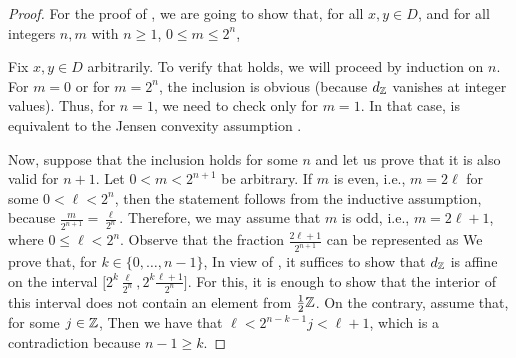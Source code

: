 \begin{proof} For the proof of , we are going to show that, for all $x,y\in D$,
and for all integers $n,m$ with $n\geq 1$, $0\leq m\leq 2^n$,

Fix $x,y\in D$ arbitrarily. To verify that  holds, we will proceed by induction on $n$. 
For $m=0$ or for $m=2^n$, the inclusion  is obvious (because $d_{\mathbb{Z}}$ vanishes at integer
values). Thus, for $n=1$, we need to check  only for $m=1$. In that case,  is
equivalent to the Jensen convexity assumption .

Now, suppose that the inclusion  holds for some $n$ and let us prove that it is also valid for
$n+1$. Let $0<m<2^{n+1}$ be arbitrary. If $m$ is even, i.e., $m=2\ell$ for some $0<\ell<2^n$, then
the statement follows from the inductive assumption, because $\frac{m}{2^{n+1}}=\frac{\ell}{2^n}$.
Therefore, we may assume that $m$ is odd, i.e., $m=2\ell+1$, where $0\leq \ell<2^n$.
Observe that the fraction $\frac{2\ell+1}{2^{n+1}}$ can be represented as
We prove that, for $k\in\{0,\dots,n-1\}$,
In view of , it suffices to show that $d_{\mathbb{Z}}$ is affine on the interval 
$\Big[2^k\frac{\ell}{2^{n}},2^k\frac{\ell+1}{2^{n}}\Big]$. For this, it is enough to show
that the interior of this interval does not contain an element from $\frac12\mathbb{Z}$. On the contrary,
assume that, for some $j\in\mathbb{Z}$,
Then we have that $\ell<2^{n-k-1}j<\ell+1$, which is a contradiction because $n-1\geq k$. 


\end{proof}
